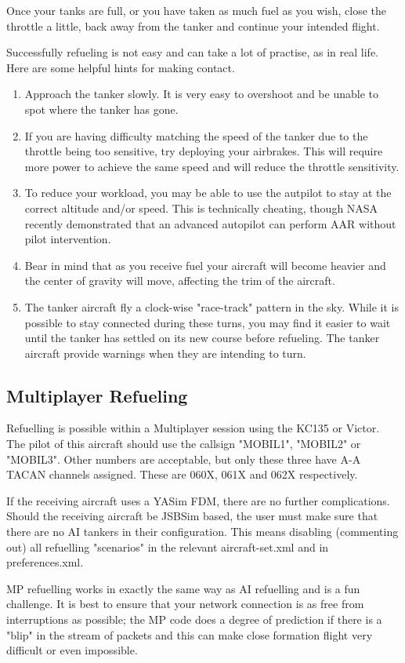Once your tanks are full, or you have taken as much fuel as you wish,
close the throttle a little, back away from the tanker and continue
your intended flight.

Successfully refueling is not easy and can take a lot of practise, as in real
life. Here are some helpful hints for making contact.

\begin{enumerate}
\item Approach the tanker slowly. It is very easy to overshoot and be unable to
spot where the tanker has gone.
\item If you are having difficulty matching the speed of the tanker due to the
throttle being too sensitive, try deploying your airbrakes. This will require
more power to achieve the same speed and will reduce the throttle sensitivity.
\item To reduce your workload, you may be able to use the autpilot to stay at
the correct altitude and/or speed. This is technically cheating, though NASA
recently demonstrated that an advanced autopilot can perform AAR without pilot
intervention.
\item Bear in mind that as you receive fuel your aircraft will become heavier
and the center of gravity will move, affecting the trim of the aircraft.
\item The tanker aircraft fly a clock-wise "race-track" pattern in the sky.
While it is possible to stay connected during these turns, you may find it
easier to wait until the tanker has settled on its new course before refueling.
The tanker aircraft provide warnings when they are intending to turn.
\end{enumerate}

\subsection{Multiplayer Refueling}

Refuelling is possible within a Multiplayer session using the KC135 or Victor.
The pilot of this aircraft should use the callsign "MOBIL1", "MOBIL2" or "MOBIL3".
Other numbers are acceptable, but only these three have A-A TACAN
channels assigned.  These are 060X, 061X and 062X respectively.

If the receiving aircraft uses a YASim FDM, there are no further
complications.  Should the receiving aircraft be JSBSim based, the user
must make sure that there are no AI tankers in their configuration.
This means disabling (commenting out) all refuelling "scenarios" in the
relevant aircraft-set.xml and in preferences.xml.

MP refuelling works in exactly the same way as AI refuelling and is a
fun challenge.  It is best to ensure that your network connection is as
free from interruptions as possible; the MP code does a degree of
prediction if there is a "blip" in the stream of packets and this can
make close formation flight very difficult or even impossible.

